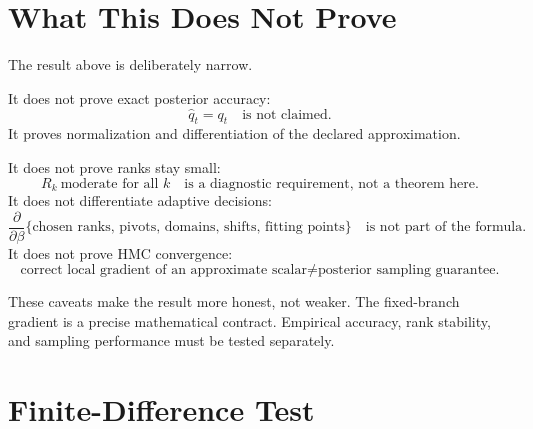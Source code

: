 \documentclass[11pt]{article}
\theoremstyle{remark}
\begin{document}
\section{What This Does Not Prove}

The result above is deliberately narrow.

It does not prove exact posterior accuracy:
\[
    \widehat q_t=q_t
    \quad\text{is not claimed.}
    \tag{90}
\]
It proves normalization and differentiation of the declared approximation.

It does not prove ranks stay small:
\[
    R_k\ \text{moderate for all }k
    \quad\text{is a diagnostic requirement, not a theorem here.}
    \tag{91}
\]
It does not differentiate adaptive decisions:
\[
    \frac{\partial}{\partial\beta}
    \{\text{chosen ranks, pivots, domains, shifts, fitting points}\}
    \quad\text{is not part of the formula.}
    \tag{92}
\]
It does not prove HMC convergence:
\[
    \text{correct local gradient of an approximate scalar}
    \ne
    \text{posterior sampling guarantee.}
    \tag{93}
\]

These caveats make the result more honest, not weaker.  The fixed-branch
gradient is a precise mathematical contract.  Empirical accuracy, rank
stability, and sampling performance must be tested separately.

\section{Finite-Difference Test}
\end{document}
